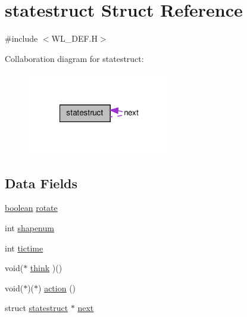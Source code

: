 \hypertarget{structstatestruct}{
\section{statestruct Struct Reference}
\label{structstatestruct}
}


{\ttfamily \#include $<$WL\_\-DEF.H$>$}



Collaboration diagram for statestruct:
\nopagebreak
\begin{figure}[H]
\begin{center}
\leavevmode
\includegraphics[width=179pt]{structstatestruct__coll__graph}
\end{center}
\end{figure}
\subsection*{Data Fields}
\begin{DoxyCompactItemize}
\item 
\hyperlink{ID__HEAD_8H_a7c6368b321bd9acd0149b030bb8275ed}{boolean} \hyperlink{structstatestruct_a8651eb9411690280521886a1cc7aab79}{rotate}
\item 
int \hyperlink{structstatestruct_adcf3b3300b91c9dd0100f73d7737ae36}{shapenum}
\item 
int \hyperlink{structstatestruct_ae04354cebc5efa782154f4112a7fb08a}{tictime}
\item 
void($\ast$ \hyperlink{structstatestruct_abaed04e5bf2c478e07f96dec8f79e676}{think} )()
\item 
void($\ast$)($\ast$) \hyperlink{structstatestruct_acdb59950009f4b7d145c3f3ac78d128a}{action} ()
\item 
struct \hyperlink{structstatestruct}{statestruct} $\ast$ \hyperlink{structstatestruct_a481b14f3f16765d8b63e6b686d9f93a7}{next}
\end{DoxyCompactItemize}


